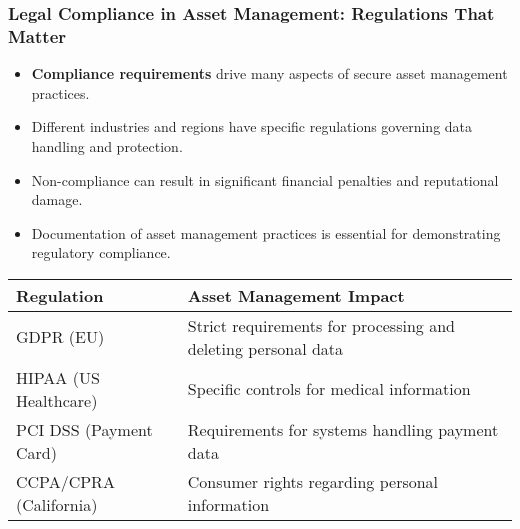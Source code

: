 \documentclass{beamer}
\begin{document}
\begin{frame}
\frametitle{Legal Compliance in Asset Management: Regulations That Matter}
\begin{itemize}
    \item \textbf{Compliance requirements} drive many aspects of secure asset management practices.
    \item Different industries and regions have specific regulations governing data handling and protection.
    \item Non-compliance can result in significant financial penalties and reputational damage.
    \item Documentation of asset management practices is essential for demonstrating regulatory compliance.
\end{itemize}

\begin{table}
    \scriptsize
\begin{tabular}{|l|p{5cm}|}
\hline
\textbf{Regulation} & \textbf{Asset Management Impact} \\
\hline
GDPR (EU) & Strict requirements for processing and deleting personal data \\
HIPAA (US Healthcare) & Specific controls for medical information \\
PCI DSS (Payment Card) & Requirements for systems handling payment data \\
CCPA/CPRA (California) & Consumer rights regarding personal information \\
\hline
\end{tabular}
\end{table}
\end{frame}
\end{document}
